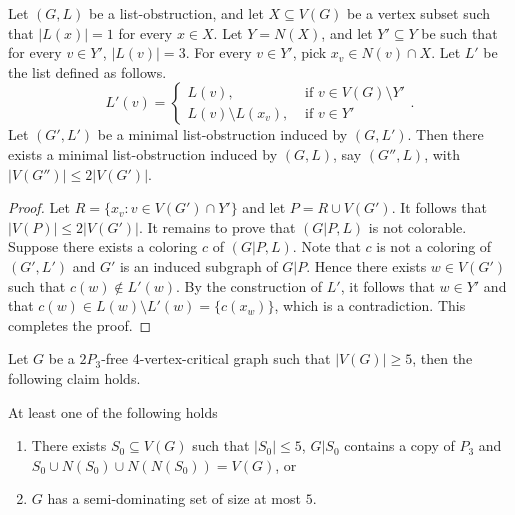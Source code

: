 \documentclass[11pt]{article}
\begin{document}
\begin{claim}\label{update3}	Let $(G,L)$ be a list-obstruction, and let $X \subseteq V(G)$ be a vertex subset such that $|L(x)|=1$ for every $x \in X$. Let $Y=N(X)$, and let $Y'\subseteq Y$ be such that for every $v\in Y'$, $|L(v)|=3$. For every $v\in Y'$, pick $x_v\in N(v)\cap X$. 
	Let $L'$ be the list defined as follows.
	\begin{equation*} 
	L'(v)=
	\begin{cases}
	L(v), & \mbox{ if } v\in V(G) \setminus Y'\\
	L(v)\setminus L(x_v), & \mbox{ if } v\in Y'
	\end{cases}.
	\end{equation*}
	Let $(G',L')$ be a minimal list-obstruction induced by $(G,L')$. 
	Then there exists a minimal list-obstruction induced by $(G,L)$, say $(G'',L)$, with $|V(G'')| \leq 2|V(G')|$.

\end{claim}
\begin{proof}
	Let $R=\{x_v:v\in V(G')\cap Y'\}$ and let $P=R\cup V(G')$. It follows that $|V(P)|\leq 2|V(G')|$.
	It remains to prove that $(G|P,L)$ is not colorable.
	Suppose there exists a coloring $c$ of $(G|P,L)$.
	Note that $c$ is not a coloring of $(G',L')$ and $G'$ is an induced subgraph of $G|P$. Hence there exists $w \in V(G')$ such that $c(w) \not \in L'(w)$. By the construction of $L'$,
	it follows that $w\in Y'$ and that $c(w) \in L(w) \setminus L'(w)=\{c(x_w)\}$, which is a contradiction.
	This completes the proof.
\end{proof}
Let $G$ be a $2P_3$-free 4-vertex-critical graph such that $|V(G)|\geq 5$, then the following claim holds.
\begin{claim}\label{T}
	At least one of the following holds
	\begin{enumerate}
		\item There exists $S_0\subseteq V(G)$ such that $|S_0|\leq 5$, $G|S_0$ contains a copy of $P_3$ and $S_0\cup  N(S_0) \cup N(N(S_0)) = V(G)$, or
		\item $G$ has a semi-dominating set of size at most $5$.
	\end{enumerate}

\end{claim}
\end{document}

